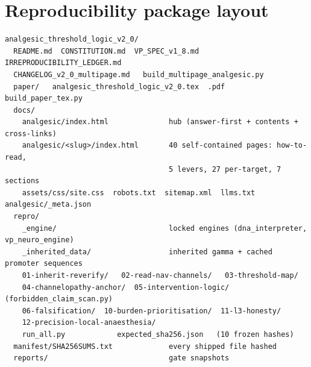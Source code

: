 \documentclass[11pt]{article}
\begin{document}
\section{Reproducibility package layout}
\begin{footnotesize}\begin{verbatim}
analgesic_threshold_logic_v2_0/
  README.md  CONSTITUTION.md  VP_SPEC_v1_8.md  IRREPRODUCIBILITY_LEDGER.md
  CHANGELOG_v2_0_multipage.md   build_multipage_analgesic.py
  paper/   analgesic_threshold_logic_v2_0.tex  .pdf  build_paper_tex.py
  docs/
    analgesic/index.html              hub (answer-first + contents + cross-links)
    analgesic/<slug>/index.html       40 self-contained pages: how-to-read,
                                      5 levers, 27 per-target, 7 sections
    assets/css/site.css  robots.txt  sitemap.xml  llms.txt  analgesic/_meta.json
  repro/
    _engine/                          locked engines (dna_interpreter, vp_neuro_engine)
    _inherited_data/                  inherited gamma + cached promoter sequences
    01-inherit-reverify/   02-read-nav-channels/   03-threshold-map/
    04-channelopathy-anchor/  05-intervention-logic/ (forbidden_claim_scan.py)
    06-falsification/  10-burden-prioritisation/  11-l3-honesty/
    12-precision-local-anaesthesia/
    run_all.py            expected_sha256.json   (10 frozen hashes)
  manifest/SHA256SUMS.txt             every shipped file hashed
  reports/                            gate snapshots

\end{verbatim}\end{footnotesize}
\end{document}
